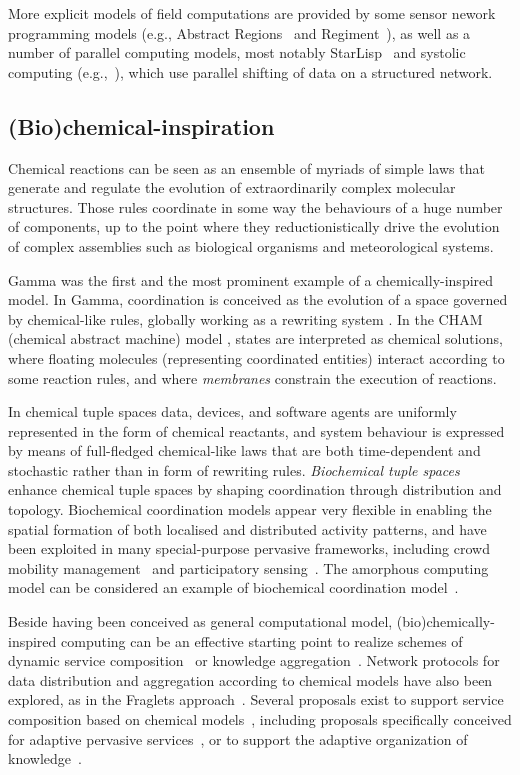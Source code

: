\documentclass[12pt,a4paper,twoside,openright]{book}
\begin{document}
More explicit models of field computations are provided by some sensor nework programming models (e.g., Abstract Regions~\cite{welsh2004regions} and Regiment~\cite{regiment}), as well
as a number of parallel computing models, most notably StarLisp~\cite{starlisp} and systolic computing (e.g.,~\cite{SDEF,ReLaCS}), which use parallel shifting of data on a structured network.


\subsection{(Bio)chemical-inspiration}

Chemical reactions can be seen as an ensemble of myriads of simple laws that generate and regulate the evolution of extraordinarily complex molecular structures.
%
Those rules coordinate in some way the behaviours of a huge number of components, up to the point where they reductionistically drive the evolution of complex assemblies such as biological organisms and meteorological systems.

Gamma \cite{gamma-scico15} was the first and the most prominent example of a chemically-inspired model.
%
In Gamma, coordination is conceived as the evolution of a space governed by chemical-like rules, globally working as a rewriting system \cite{gamma-lncs2235}.
%
In the CHAM (chemical abstract machine) model \cite{cham-tcs96}, states are interpreted as chemical solutions, where floating molecules (representing coordinated entities) interact according to some reaction rules, and where \emph{membranes} constrain the execution of reactions.

In chemical tuple spaces \cite{chemcoord-soarbook} data, devices, and software agents are uniformly represented in the form of chemical reactants, and system behaviour is expressed by means of full-fledged chemical-like laws that are both time-dependent and stochastic rather than in form of rewriting rules.
%
\emph{Biochemical tuple spaces}~\cite{VCMZ-TAAS2011} enhance chemical tuple spaces by shaping coordination through distribution and topology.
%
Biochemical coordination models appear very flexible in enabling the spatial formation of both localised and distributed activity patterns, and have been exploited in many special-purpose pervasive frameworks, including crowd mobility management~\cite{werfel} and participatory sensing~\cite{lee}. The amorphous computing model can be considered an example of biochemical coordination model~\cite{amorphous}.

Beside having been conceived as general computational model, (bio)chemically-inspired computing can be an effective starting point to realize schemes of dynamic service composition~\cite{frei} or knowledge aggregation~\cite{mariani2013molecules}.
%
Network protocols for data distribution and aggregation according to chemical models have also been explored, as in the Fraglets approach~\cite{Meyer07,Monti13}.
%
Several proposals exist to support service composition based on chemical models~\cite{BanP09}, including proposals specifically conceived for adaptive pervasive services~\cite{cpe}, or to support the adaptive organization of knowledge~\cite{mariani2013molecules}.
\end{document}
